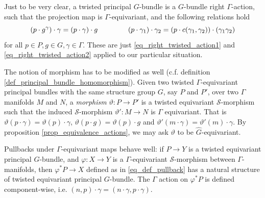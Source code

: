 \begin{obs}
    Just to be very clear, a twisted principal \(G\)-bundle is a \(G\)-bundle right \(\Gamma\)-action, such that the projection map is \(\Gamma\)-equivariant, and the following relations hold
    \begin{equation} \label{eq_twisted_principal_bundles}
        (p\cdot g^\gamma)\cdot \gamma = (p\cdot \gamma)\cdot g \hspace{1.5 cm} (p\cdot \gamma_1)\cdot \gamma_2  = (p\cdot c(\gamma_1, \gamma_2))\cdot (\gamma_1\gamma_2)
    \end{equation}
    for all \(p \in P, g \in G, \gamma \in \Gamma\). These are just \eqref{eq_right_twisted_action1} and \eqref{eq_right_twisted_action2} applied to our particular situation.
\end{obs}

\noindent
\begin{minipage}{0.79 \textwidth}
    The notion of morphism has to be modified as well (c.f. definition \ref{def_principal_bundle_homomorphism}). Given two twisted \(\Gamma\)-equivariant principal bundles with the same structure group \(G\), say \(P\) and \(P'\), over two \(\Gamma\) manifolds \(M\) and \(N\), a \textit{morphism} \(\vartheta\colon P \to P'\) is a twisted equivariant \(\mathcal{S}\)-morphism such that the induced \(\mathcal{S}\)-morphism \(\vartheta'\colon M \to N\) is \(\Gamma\) equivariant. That is \(\vartheta(p \cdot \gamma)=\vartheta(p)\cdot \gamma\), \(\vartheta(p\cdot g)=\vartheta(p)\cdot g\) and \(\vartheta'(m\cdot \gamma)=\vartheta'(m)\cdot \gamma\). By proposition \ref{prop_equivalence_actions}, we may ask \(\vartheta\) to be \(\hat{G}\)-equivariant.
\end{minipage}%
\begin{minipage}{0.20 \textwidth}
        \begin{center}
\end{center}
\end{minipage}
\newline

Pullbacks under \(\Gamma\)-equivariant maps behave well: if \(P \to Y\) is a twisted equivariant principal \(G\)-bundle, and \(\varphi\colon X \to Y\) is a \(\Gamma\)-equivariant \(\mathcal{S}\)-morphism between \(\Gamma\)-manifolds, then \(\varphi^*P\to X\) defined as in \eqref{eq_def_pullback} has a natural structure of twisted equivariant principal \(G\)-bundle. The \(\Gamma\) action on \(\varphi^*P\) is defined component-wise, i.e. \((n,p)\cdot \gamma=(n\cdot \gamma, p\cdot \gamma)\). \newline \newline


